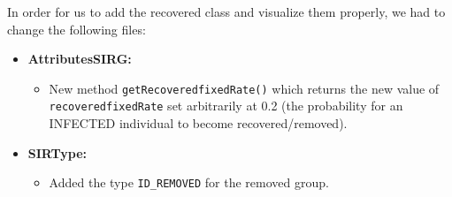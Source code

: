 In order for us to add the recovered class and visualize them properly, we had to change the following files:
\begin{itemize}
    \item \textbf{AttributesSIRG:} 
    \begin{itemize}
        \item New method \texttt{getRecoveredfixedRate()} which returns the new value of \texttt{recoveredfixedRate} set arbitrarily at 0.2 (the probability for an INFECTED individual to become recovered/removed).
    \end{itemize}

    \item \textbf{SIRType:} 
    \begin{itemize}
        \item Added the type \texttt{ID\_REMOVED} for the removed group.
    \end{itemize}


\end{itemize}
